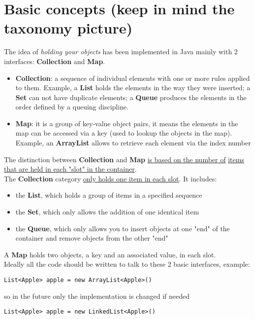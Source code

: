 \documentclass[10pt,letterpaper]{report}
\begin{document}
\section{Basic concepts (keep in mind the taxonomy picture)}
The idea of \textit{holding your objects} has been implemented in Java mainly with 2 interfaces: \textbf{Collection} and \textbf{Map}.\\
\begin{itemize}
\item \textbf{Collection}: a sequence of individual elements with one or more rules applied to them. Example, a \textbf{List} holds the elements in the way they were inserted; a \textbf{Set} can not have duplicate elements; a \textbf{Queue} produces the elements in the order defined by a queuing discipline.
\item \textbf{Map}: it is a group of key-value object pairs, it means the elements in the map can be accessed via a key (used to lookup the objects in the map). Example, an \textbf{ArrayList} allows to retrieve each element via the index number
\end{itemize}

The distinction between \textbf{Collection} and \textbf{Map} \underline{is based on the number of} \underline{items that are held in each "slot" in the container}.\\
The \textbf{Collection} category \underline{only holds one item in each slot}. It includes:
\begin{itemize}
\item the \textbf{List}, which holds a group of items in a specified sequence
\item the \textbf{Set}, which only allows the addition of one identical item
\item the \textbf{Queue}, which only allows you to insert objects at one "end" of the container and remove objects from the other "end"
\end{itemize}

A \textbf{Map} holds two objects, a key and an associated value, in each slot.\\

Ideally all the code should be written to talk to these 2 basic interfaces, example:
\begin{lstlisting}
List<Apple> apple = new ArrayList<Apple>()
\end{lstlisting}

so in the future only the implementation is changed if needed
\begin{lstlisting}
List<Apple> apple = new LinkedList<Apple>()
\end{lstlisting}
\end{document}
